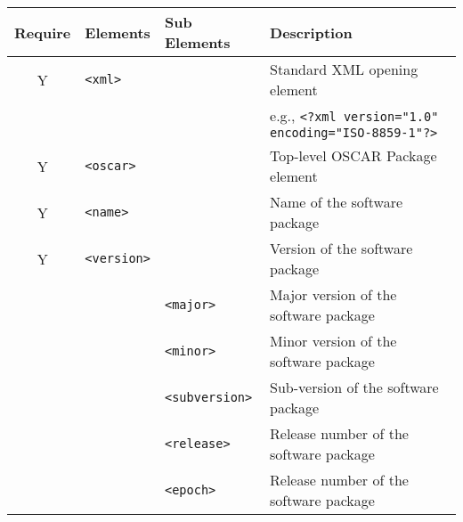 \begin{table}[h!]
%
%
%
\begin{small}
  \begin{center}
  \begin{tabular}{|c|l|l|l|} 
  \hline
  
  {\bfseries Require} & {\bfseries Elements} 
		& {\bfseries Sub Elements} 
		& {\bfseries Description} 
		\\\hline
		\hline

  Y & \verb|<xml>|
		& 
		& Standard XML opening element
		\\
    & 
		&                 
		&  e.g., {\footnotesize \verb|<?xml version="1.0" encoding="ISO-8859-1"?>|}
		\\\hline

%
  Y & \verb|<oscar>|   
		&   
		& Top-level OSCAR Package element               
		\\ \hline

  Y & \verb|<name>|    
		&   
		& Name of the software package                  
        \\ \hline

  Y & \verb|<version>|
        & 
        & Version of the software package           
        \\\cline{3-4}
%
    & 
		& \verb|<major>|  
		& Major version of the software package     
		\\\cline{3-4}
%
    & 
		& \verb|<minor>|  
		& Minor version of the software package     
		\\\cline{3-4}
%
    & 
		& \verb|<subversion>| 
		& Sub-version of the software package   
		\\\cline{3-4}
%
	& 
		& \verb|<release>|    
		& Release number of the software package
		\\\cline{3-4}
%
	& 
		& \verb|<epoch>|      
		& Release number of the software package
		\\\hline


\end{tabular}
\end{center}
\end{small}
\end{table}
